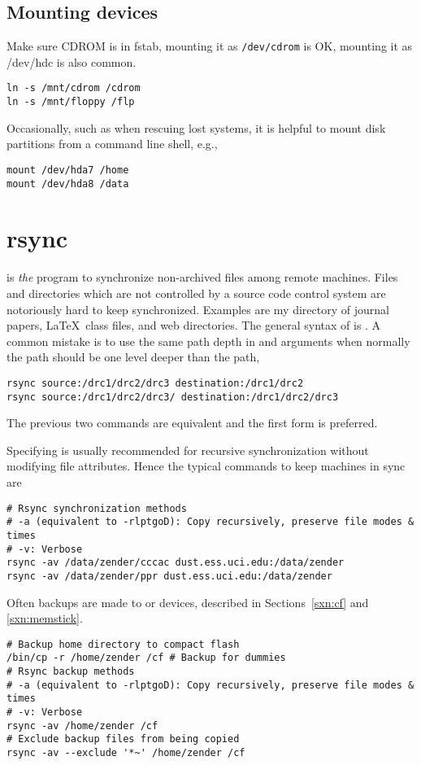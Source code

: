 \documentclass[12pt,twoside]{article}
\begin{document}
\subsection{Mounting devices}\label{sxn:mnt}
Make sure CDROM is in fstab, mounting it as \verb'/dev/cdrom' is OK,
mounting it as /dev/hdc is also common. 
\begin{verbatim}
ln -s /mnt/cdrom /cdrom
ln -s /mnt/floppy /flp
\end{verbatim}
Occasionally, such as when rescuing lost systems, it is helpful to
mount disk partitions from a command line shell, e.g.,
\begin{verbatim}
mount /dev/hda7 /home
mount /dev/hda8 /data
\end{verbatim}

\section{rsync}\label{sxn:rsync}
 is \textit{the} program to synchronize non-archived
files among remote machines.
Files and directories which are not controlled by a source code
control system are notoriously hard to keep synchronized.
Examples are my directory of  journal papers, \LaTeX\ class
files, and web directories.
The general syntax of  is .
A common mistake is to use the same path depth in  and
 arguments when normally the  path should be
one level deeper than the  path,
\begin{verbatim}
rsync source:/drc1/drc2/drc3 destination:/drc1/drc2
rsync source:/drc1/drc2/drc3/ destination:/drc1/drc2/drc3
\end{verbatim}
The previous two commands are equivalent and the first form is preferred. 

Specifying  is usually recommended for recursive
synchronization without modifying file attributes.
Hence the typical commands to keep machines in sync are
\begin{verbatim}
# Rsync synchronization methods
# -a (equivalent to -rlptgoD): Copy recursively, preserve file modes & times 
# -v: Verbose
rsync -av /data/zender/cccac dust.ess.uci.edu:/data/zender
rsync -av /data/zender/ppr dust.ess.uci.edu:/data/zender
\end{verbatim}

Often backups are made to  or 
 devices, described in Sections~\ref{sxn:cf} and
\ref{sxn:memstick}.
\begin{verbatim}
# Backup home directory to compact flash
/bin/cp -r /home/zender /cf # Backup for dummies
# Rsync backup methods
# -a (equivalent to -rlptgoD): Copy recursively, preserve file modes & times 
# -v: Verbose
rsync -av /home/zender /cf
# Exclude backup files from being copied
rsync -av --exclude '*~' /home/zender /cf
\end{verbatim}
\end{document}
